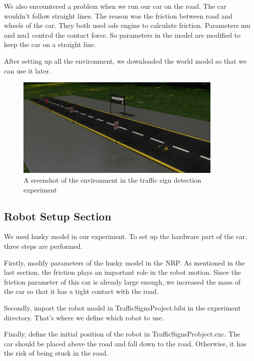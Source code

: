 We also encountered a problem when we run our car on the road. The car wouldn't follow straight lines. The reason was the friction between road and wheels of the car. They both used ode engine to calculate friction. Parameters mu and mu1 control the contact force. So parameters in the model are modified to keep the car on a straight line. 

After setting up all the environment, we downloaded the world model so that we can use it later.


\begin{figure}
  \centering
  \includegraphics[width=0.9\textwidth]{chapter/images/img-3.png}
  \caption{A sreenshot of the environment in the traffic sign detection experiment}
  \label{fig:img}
\end{figure}


\subsection{Robot Setup Section}

We used husky model in our experiment. To set up the hardware part of the car, three steps are performed.


Firstly, modify parameters of the husky model in the NRP. As mentioned in the last section, the friction plays an important role in the robot motion. Since the friction parameter of this car is already large enough, we increased the mass of the car so that it has a tight contact with the road.


Secondly, import the robot model in TrafficSignsProject.bibi in the experiment directory. That's where we define which robot to use.


Finally, define the initial position of the robot in TrafficSignsProbject.exc. The car should be placed above the road and fall down to the road. Otherwise, it has the risk of being stuck in the road.



